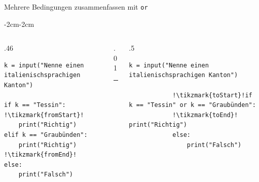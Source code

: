\begin{frame}[fragile]{Mehrere Bedingungen zusammenfassen mit \lstinline|or|}
    \begin{adjustwidth}{-2cm}{-2cm}
        \begin{columns}
            \begin{column}{.46\pagewidth}
                \begin{lstlisting}[escapechar=!, basicstyle=\footnotesize\ttfamily]
k = input("Nenne einen italienischsprachigen Kanton")

if k == "Tessin":      !\tikzmark{fromStart}!
    print("Richtig")
elif k == "Graubünden": 
    print("Richtig")   !\tikzmark{fromEnd}!
else:
    print("Falsch")
\end{lstlisting}
            \end{column}
            \begin{column}{.01\pagewidth}
                \rule{0.4pt}{\textheight}
            \end{column}
            \begin{column}{.5\pagewidth}
                \begin{lstlisting}[escapechar=!, basicstyle=\footnotesize\ttfamily]
            k = input("Nenne einen italienischsprachigen Kanton")
            
            !\tikzmark{toStart}!if k == "Tessin" or k == "Graubünden":
            !\tikzmark{toEnd}!    print("Richtig")
            else:
                print("Falsch")
        \end{lstlisting}
            \end{column}
        \end{columns}
    \end{adjustwidth}
\end{frame}

